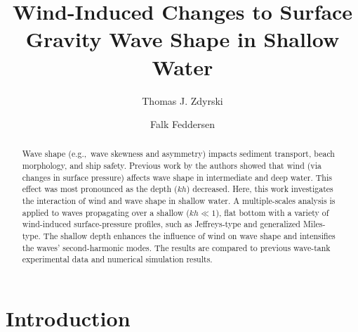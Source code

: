 \documentclass{jfm}
\title{Wind-Induced Changes to Surface Gravity Wave Shape in Shallow Water}
\author{Thomas J. Zdyrski \and Falk Feddersen}
\begin{document}
\maketitle

\begin{abstract}
Wave shape (e.g.,\ wave skewness and asymmetry) impacts sediment
transport, beach morphology, and ship safety.
Previous work by the authors showed that wind (via changes in surface
pressure) affects wave shape in intermediate and deep water.
This effect was most pronounced as the depth ($kh$) decreased.
Here, this work investigates the interaction of wind and wave shape in
shallow water.
A multiple-scales analysis is applied to waves propagating over a
shallow ($kh \ll 1$), flat bottom with a variety of wind-induced
surface-pressure profiles, such as Jeffreys-type and generalized
Miles-type.
The shallow depth enhances the influence of wind on wave shape and
intensifies the waves' second-harmonic modes.
The results are compared to previous wave-tank experimental data and
numerical simulation results.
\end{abstract}

\section{Introduction}
\end{document}
